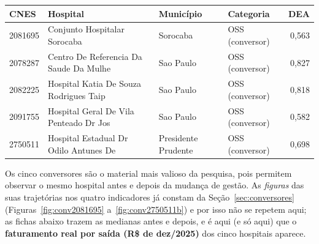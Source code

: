 \begin{center}\small
\begin{tabular}{llllr}
\toprule
CNES & Hospital & Município & Categoria & DEA \\
\midrule
2081695 & Conjunto Hospitalar Sorocaba & Sorocaba & OSS (conversor) & 0,563 \\
2078287 & Centro De Referencia Da Saude Da Mulhe & Sao Paulo & OSS (conversor) & 0,827 \\
2082225 & Hospital Katia De Souza Rodrigues Taip & Sao Paulo & OSS (conversor) & 0,818 \\
2091755 & Hospital Geral De Vila Penteado Dr Jos & Sao Paulo & OSS (conversor) & 0,582 \\
2750511 & Hospital Estadual Dr Odilo Antunes De  & Presidente Prudente & OSS (conversor) & 0,698 \\
\bottomrule
\end{tabular}
\end{center}

Os cinco conversores são o material mais valioso da pesquisa, pois
permitem observar o mesmo hospital antes e depois da mudança de gestão.
As \emph{figuras} das suas trajetórias nos quatro indicadores já constam
da Seção~\ref{sec:conversores} (Figuras~\ref{fig:conv2081695}
a~\ref{fig:conv2750511b}) e por isso não se repetem aqui; as fichas
abaixo trazem as medianas antes e depois, e é aqui (e só aqui) que
o \textbf{faturamento real por saída (R\$ de dez/2025)} dos cinco
hospitais aparece.

